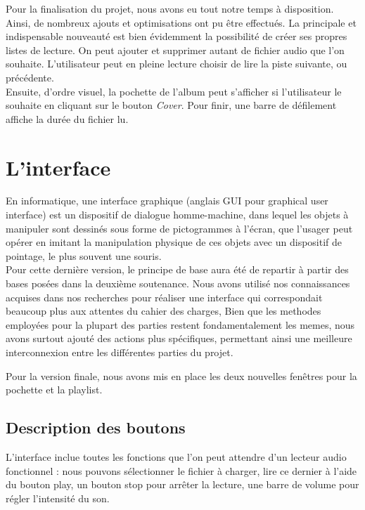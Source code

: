 \documentclass[12pt,a4paper]{report}
\begin{document}
Pour la finalisation du projet, nous avons eu tout notre temps à disposition. Ainsi, de nombreux ajouts et optimisations ont pu être effectués.
La principale et indispensable nouveauté est bien évidemment la possibilité de créer ses propres listes de lecture. On peut ajouter et supprimer autant de fichier audio que l'on souhaite. L'utilisateur peut en pleine lecture choisir de lire la piste suivante, ou précédente.\\
Ensuite, d'ordre visuel, la pochette de l'album peut s'afficher si l'utilisateur le souhaite en cliquant sur le bouton \emph{Cover}. Pour finir, une barre de défilement affiche la durée du fichier lu.

\chapter{L'interface}

En informatique, une interface graphique (anglais GUI pour graphical user interface) est un dispositif de dialogue homme-machine, dans lequel les objets à manipuler sont dessinés sous forme de pictogrammes à l'écran, que l'usager peut opérer en imitant la manipulation physique de ces objets avec un dispositif de pointage, le plus souvent une souris.\\

Pour cette dernière version, le principe de base aura été de repartir à
partir des bases posées dans la deuxième soutenance. Nous avons utilisé nos connaissances acquises dans nos recherches pour réaliser une interface qui correspondait beaucoup plus aux attentes du cahier des charges, Bien que les methodes employées pour la plupart des parties restent fondamentalement les memes, nous avons surtout ajouté des actions plus spécifiques, permettant ainsi une meilleure interconnexion entre les différentes parties du projet.

Pour la version finale, nous avons mis en place les deux nouvelles fenêtres pour la pochette et la playlist.

\section{Description des boutons}

L'interface inclue toutes les fonctions que l'on peut attendre d'un lecteur
audio fonctionnel : nous pouvons sélectionner le fichier à charger, lire ce dernier à l'aide du bouton play, un bouton stop pour arrêter la lecture, une barre de volume pour régler l'intensité du son.
\end{document}
